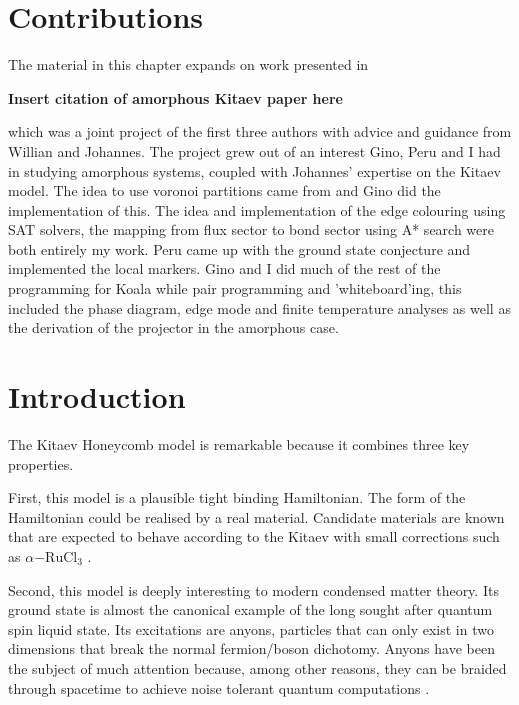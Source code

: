 \hypertarget{contributions}{%
\section{Contributions}\label{contributions}}

The material in this chapter expands on work presented in

\textbf{Insert citation of amorphous Kitaev paper here}

which was a joint project of the first three authors with advice and guidance from Willian and Johannes. The project grew out of an interest Gino, Peru and I had in studying amorphous systems, coupled with Johannes' expertise on the Kitaev model. The idea to use voronoi partitions came from \autocite{marsalTopologicalWeaireThorpe2020} and Gino did the implementation of this. The idea and implementation of the edge colouring using SAT solvers, the mapping from flux sector to bond sector using A* search were both entirely my work. Peru came up with the ground state conjecture and implemented the local markers. Gino and I did much of the rest of the programming for Koala while pair programming and 'whiteboard'ing, this included the phase diagram, edge mode and finite temperature analyses as well as the derivation of the projector in the amorphous case.

\hypertarget{introduction}{%
\section{Introduction}\label{introduction}}

The Kitaev Honeycomb model is remarkable because it combines three key properties.

First, this model is a plausible tight binding Hamiltonian. The form of the Hamiltonian could be realised by a real material. Candidate materials are known that are expected to behave according to the Kitaev with small corrections such as \(\alpha\mathrm{-RuCl}_3\) \autocite{banerjeeProximateKitaevQuantum2016,trebstKitaevMaterials2022}.

Second, this model is deeply interesting to modern condensed matter theory. Its ground state is almost the canonical example of the long sought after quantum spin liquid state. Its excitations are anyons, particles that can only exist in two dimensions that break the normal fermion/boson dichotomy. Anyons have been the subject of much attention because, among other reasons, they can be braided through spacetime to achieve noise tolerant quantum computations \textcite{freedmanTopologicalQuantumComputation2003}.

